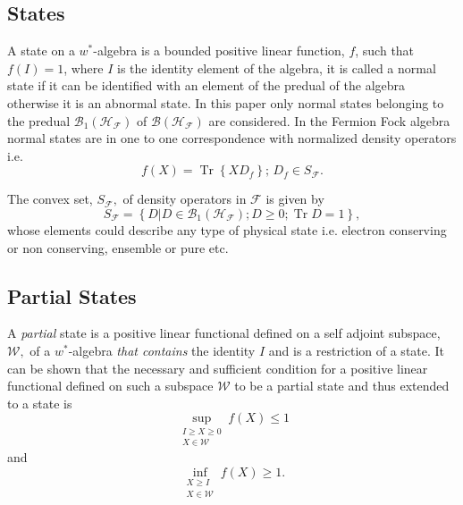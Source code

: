 \documentclass[aps,preprint]{revtex4}%
\begin{document}
\subsection{States \label{States}}

A state on a $w^{\ast}$-algebra is a bounded positive linear function, $f$,
such that $f\left(  I\right)  =1$, where $I$ is the identity element of the
algebra, it is called a normal state if it can be identified with an element
of the predual of the algebra otherwise it is an abnormal state. In this paper
only normal states belonging to the predual $\mathcal{B}_{1}\left(
\mathcal{H}_{\mathcal{F}}\right)  $ of $\mathcal{B}\left(  \mathcal{H}%
_{\mathcal{F}}\right)  $ are considered. In the Fermion Fock algebra normal
states are in one to one correspondence with normalized density operators
i.e.
\begin{equation}
f\left(  X\right)  =\operatorname*{Tr}\left\{  XD_{f}\right\}  ;\,D_{f}\in
S_{\mathcal{F}}.
\end{equation}


The convex set, $S_{\mathcal{F}},$ of density operators in $\mathcal{F}$ is
given by
\begin{equation}
S_{\mathcal{F}}=\left\{  D\left\vert D\in\mathcal{B}_{1}\left(  \mathcal{H}%
_{\mathcal{F}}\right)  ;D\geq0;\operatorname{Tr}D=1\right.  \right\}  ,
\end{equation}
whose elements could describe any type of physical state i.e. electron
conserving or non conserving, ensemble or pure etc.

\subsection{Partial States \label{Partial States}}

A \emph{partial} state is a positive linear functional defined on a self
adjoint subspace, $\mathcal{W},$ of a $w^{\ast}$-algebra \emph{that contains}
the identity $I$ and is a restriction of a state. It can be shown \cite{Emch,
Krein} that the necessary and sufficient condition for a positive linear
functional defined on such a subspace $\mathcal{W}$ to be a partial state and
thus extended to a state is
\begin{equation}
\sup_{\substack{I\geq X\geq0\\X\in\mathcal{W}}}f\left(  X\right)  \leq1
\label{LessI}%
\end{equation}
and%
\begin{equation}
\inf_{\substack{X\geq I\\X\in\mathcal{W}}}f\left(  X\right)  \geq1.
\label{MoreI}%
\end{equation}
\end{document}

